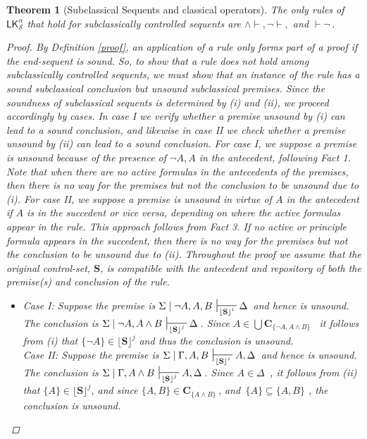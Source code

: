 \documentclass{article}                     %
\theoremstyle{theorem}
\newtheorem{theorem}{Theorem}
\theoremstyle{corollary}
\theoremstyle{lemma}
\theoremstyle{definition}
\theoremstyle{remark}
\theoremstyle{definition}
\theoremstyle{notation}
\theoremstyle{definition}
\theoremstyle{proposition}
\theoremstyle{definition}
\begin{document}
\begin{theorem}[Subclassical Sequents and classical operators]
The only rules of $ \mathsf{LK}^\alpha_\mathcal{S} $  that hold for subclassically controlled sequents are $ \wedge\vdash, \neg\vdash,$ and $\vdash\neg\, $.

\begin{proof}
By Definition \ref{proof}, an application of a rule only forms part of a proof if the end-sequent is sound. So, to show that a rule does not hold among subclassically controlled sequents, we must show that an instance of the rule has a sound subclassical conclusion but unsound subclassical premises. Since the soundness of subclassical sequents is determined by (i) and (ii), we proceed accordingly by cases. In case I we verify whether a premise unsound by (i) can lead to a sound conclusion, and likewise in case II we check whether a premise unsound by (ii) can lead to a sound conclusion. For case I, we suppose a premise is unsound because of the presence of $ \neg A , A$ in the antecedent, following Fact 1. Note that when there are no active formulas in the antecedents of the premises, then there is no way for the premises but not the conclusion to be unsound due to (i). For case II, we suppose a premise is unsound in virtue of $ A $ in the antecedent if $ A $ is in the succedent or vice versa, depending on where the active formulas appear in the rule. This approach follows from Fact 3. If no active or principle formula appears in the succedent, then there is no way for the premises but not the conclusion to be unsound due to (ii). Throughout the proof we assume that the original control-set, $ \mathbf{S} $, is compatible with the antecedent and repository of both the premise(s) and conclusion of the rule.


\begin{itemize}[itemsep=3mm]
	\item[$\checkmark \wedge\vdash $]
Case I: Suppose the premise is $\Sigma\mid\neg A ,A, B \,\sststile{\lfloor\mathbf{S}\rfloor^{i}}{} \Delta\,$ and hence is unsound. The conclusion is $\Sigma\mid\neg A ,A \wedge B \,\sststile{\lfloor\mathbf{S}\rfloor^{j}}{} \Delta\,$.  Since $A \in \bigcup\mathbf{C}_{\{\neg A, A\wedge B\}}$ \, it follows from (i) that $ \{\neg A\} \in \mathbf{\lfloor\mathbf{S}\rfloor}^{j} $ and thus the conclusion is unsound.\\

Case II: Suppose the premise is $\Sigma\mid\Gamma, A, B \,\sststile{\lfloor\mathbf{S}\rfloor^{i}}{} A, \Delta\,$ and hence is unsound. The conclusion is $\Sigma\mid\Gamma, A \wedge B \,\sststile{\lfloor\mathbf{S}\rfloor^{j}}{} A, \Delta\,$. Since $A \in \Delta$ \,, it follows from (ii) that $ \{A\} \in \lfloor\mathbf{S}\rfloor^{j} $, and since $ \{A,B\} \in \mathbf{C}_{\{A\wedge B\}}$\,, and \,$ \{A\} \subseteq \{A,B\} $ , the conclusion is unsound.


\end{itemize}
\end{proof}
\end{theorem}
\end{document}

